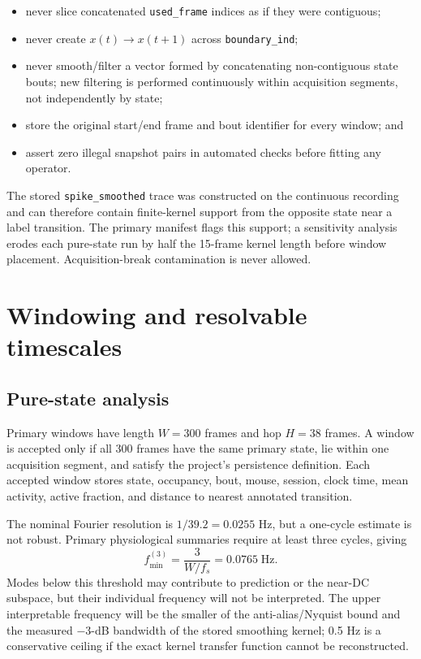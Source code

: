 \documentclass[11pt,a4paper]{article}
\begin{document}
\begin{itemize}
  \item never slice concatenated \texttt{used\_frame} indices as if they were contiguous;
  \item never create $x(t)\rightarrow x(t+1)$ across \texttt{boundary\_ind};
  \item never smooth/filter a vector formed by concatenating non-contiguous state bouts; new filtering is performed continuously within acquisition segments, not independently by state;
  \item store the original start/end frame and bout identifier for every window; and
  \item assert zero illegal snapshot pairs in automated checks before fitting any operator.
\end{itemize}

The stored \texttt{spike\_smoothed} trace was constructed on the continuous recording and can therefore contain finite-kernel support from the opposite state near a label transition. The primary manifest flags this support; a sensitivity analysis erodes each pure-state run by half the 15-frame kernel length before window placement. Acquisition-break contamination is never allowed.

\section{Windowing and resolvable timescales}

\subsection{Pure-state analysis}

Primary windows have length $W=300$ frames and hop $H=38$ frames. A window is accepted only if all 300 frames have the same primary state, lie within one acquisition segment, and satisfy the project's persistence definition. Each accepted window stores state, occupancy, bout, mouse, session, clock time, mean activity, active fraction, and distance to nearest annotated transition.

The nominal Fourier resolution is $1/39.2=0.0255$ Hz, but a one-cycle estimate is not robust. Primary physiological summaries require at least three cycles, giving
\begin{equation}
  f_{\min}^{(3)}=\frac{3}{W/f_s}=0.0765\;\mathrm{Hz}.
\end{equation}
Modes below this threshold may contribute to prediction or the near-DC subspace, but their individual frequency will not be interpreted. The upper interpretable frequency will be the smaller of the anti-alias/Nyquist bound and the measured $-3$-dB bandwidth of the stored smoothing kernel; 0.5 Hz is a conservative ceiling if the exact kernel transfer function cannot be reconstructed.
\end{document}
